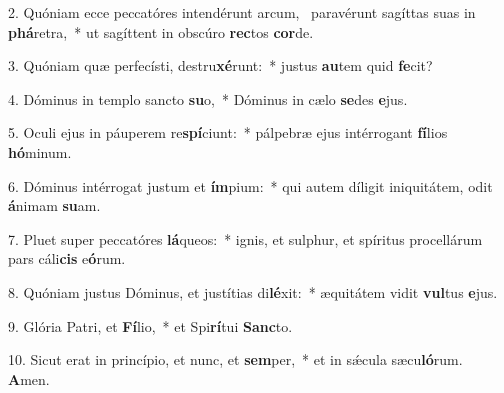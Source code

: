 2. Quóniam ecce peccatóres intendérunt arcum, \dag\  paravérunt sagíttas suas in \textbf{phá}retra,~*  ut sagíttent in obscúro \textbf{rec}tos \textbf{cor}de.\

3. Quóniam quæ perfecísti, destru\textbf{xé}runt:~*  justus \textbf{au}tem quid \textbf{fe}cit?\

4. Dóminus in templo sancto \textbf{su}o,~*  Dóminus in cælo \textbf{se}des \textbf{e}jus.\

5. Oculi ejus in páuperem re\textbf{spí}ciunt:~*  pálpebræ ejus intérrogant \textbf{fí}lios \textbf{hó}minum.\

6. Dóminus intérrogat justum et \textbf{ím}pium:~*  qui autem díligit iniquitátem, odit \textbf{á}nimam \textbf{su}am.\

7. Pluet super peccatóres \textbf{lá}queos:~*  ignis, et sulphur, et spíritus procellárum pars cáli\textbf{cis} e\textbf{ó}rum.\

8. Quóniam justus Dóminus, et justítias di\textbf{lé}xit:~*  æquitátem vidit \textbf{vul}tus \textbf{e}jus.\

9. Glória Patri, et \textbf{Fí}lio,~*  et Spi\textbf{rí}tui \textbf{Sanc}to.\

10. Sicut erat in princípio, et nunc, et \textbf{sem}per,~*  et in sǽcula sæcu\textbf{ló}rum. \textbf{A}men.\

